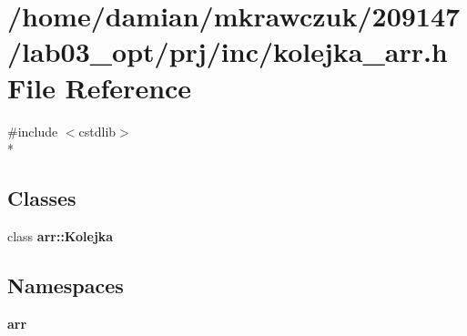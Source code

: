 \section{/home/damian/mkrawczuk/209147/lab03\-\_\-opt/prj/inc/kolejka\-\_\-arr.h File Reference}
\label{kolejka__arr_8h}
{\ttfamily \#include $<$cstdlib$>$}\\*
\subsection*{Classes}
\begin{DoxyCompactItemize}
\item 
class {\bf arr\-::\-Kolejka}
\end{DoxyCompactItemize}
\subsection*{Namespaces}
\begin{DoxyCompactItemize}
\item 
{\bf arr}
\end{DoxyCompactItemize}
